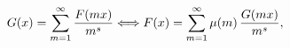 \[G(x)=\sum_{m=1}^{\infty}\frac{F(mx)}{m^{s}}\Longleftrightarrow F(x)=\sum_{m=1}%
^{\infty}\mathop{\mu\/}\nolimits\!\left(m\right)\frac{G(mx)}{m^{s}},\]